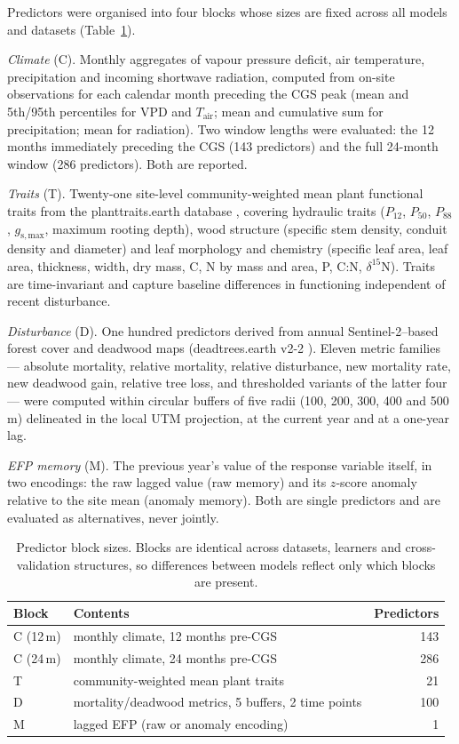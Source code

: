 \documentclass[pdflatex,sn-nature]{sn-jnl}%
\theoremstyle{thmstyleone}%
\theoremstyle{thmstyletwo}%
\theoremstyle{thmstylethree}%
\begin{document}
Predictors were organised into four blocks whose sizes are fixed across all models and datasets (Table~\ref{tab:blocks}).

\textit{Climate} (C). Monthly aggregates of vapour pressure deficit, air temperature, precipitation and incoming shortwave radiation, computed from on-site observations for each calendar month preceding the CGS peak (mean and 5th/95th percentiles for VPD and $T_\mathrm{air}$; mean and cumulative sum for precipitation; mean for radiation). Two window lengths were evaluated: the 12 months immediately preceding the CGS (143 predictors) and the full 24-month window (286 predictors). Both are reported.

\textit{Traits} (T). Twenty-one site-level community-weighted mean plant functional traits from the planttraits.earth database \cite{lusk2026crowdsourced}, covering hydraulic traits ($P_{12}$, $P_{50}$, $P_{88}$, $g_\mathrm{s,max}$, maximum rooting depth), wood structure (specific stem density, conduit density and diameter) and leaf morphology and chemistry (specific leaf area, leaf area, thickness, width, dry mass, C, N by mass and area, P, C:N, $\delta^{15}$N). Traits are time-invariant and capture baseline differences in functioning independent of recent disturbance.

\textit{Disturbance} (D). One hundred predictors derived from annual Sentinel-2--based forest cover and deadwood maps (deadtrees.earth v2-2 \cite{mosig2026deadtrees}). Eleven metric families --- absolute mortality, relative mortality, relative disturbance, new mortality rate, new deadwood gain, relative tree loss, and thresholded variants of the latter four --- were computed within circular buffers of five radii (100, 200, 300, 400 and 500\,m) delineated in the local UTM projection, at the current year and at a one-year lag.

\textit{EFP memory} (M). The previous year's value of the response variable itself, in two encodings: the raw lagged value (raw memory) and its $z$-score anomaly relative to the site mean (anomaly memory). Both are single predictors and are evaluated as alternatives, never jointly.

\begin{table}[h!]
\centering
\small
\begin{tabular}{llr}
\hline
Block & Contents & Predictors \\
\hline
C (12\,m) & monthly climate, 12 months pre-CGS & 143 \\
C (24\,m) & monthly climate, 24 months pre-CGS & 286 \\
T & community-weighted mean plant traits & 21 \\
D & mortality/deadwood metrics, 5 buffers, 2 time points & 100 \\
M & lagged EFP (raw or anomaly encoding) & 1 \\
\hline
\end{tabular}
\caption{Predictor block sizes. Blocks are identical across datasets, learners and cross-validation structures, so differences between models reflect only which blocks are present.}
\label{tab:blocks}
\end{table}
\end{document}
